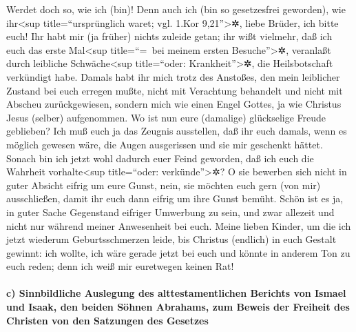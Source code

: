  Werdet doch so, wie ich (bin)! Denn auch ich (bin so
gesetzesfrei geworden), wie ihr\textless sup title=``ursprünglich waret;
vgl. 1.Kor 9,21''\textgreater✲, liebe Brüder, ich bitte euch! Ihr habt
mir (ja früher) nichts zuleide getan;  ihr wißt vielmehr,
daß ich euch das erste Mal\textless sup title=``=~bei meinem ersten
Besuche''\textgreater✲, veranlaßt durch leibliche Schwäche\textless sup
title=``oder: Krankheit''\textgreater✲, die Heilsbotschaft verkündigt
habe.  Damals habt ihr mich trotz des Anstoßes, den mein
leiblicher Zustand bei euch erregen mußte, nicht mit Verachtung
behandelt und nicht mit Abscheu zurückgewiesen, sondern mich wie einen
Engel Gottes, ja wie Christus Jesus (selber) aufgenommen.
 Wo ist nun eure (damalige) glückselige Freude geblieben?
Ich muß euch ja das Zeugnis ausstellen, daß ihr euch damals, wenn es
möglich gewesen wäre, die Augen ausgerissen und sie mir geschenkt
hättet.  Sonach bin ich jetzt wohl dadurch euer Feind
geworden, daß ich euch die Wahrheit vorhalte\textless sup title=``oder:
verkünde''\textgreater✲?  O sie bewerben sich nicht in
guter Absicht eifrig um eure Gunst, nein, sie möchten euch gern (von
mir) ausschließen, damit ihr euch dann eifrig um ihre Gunst bemüht.
 Schön ist es ja, in guter Sache Gegenstand eifriger
Umwerbung zu sein, und zwar allezeit und nicht nur während meiner
Anwesenheit bei euch.  Meine lieben Kinder, um die ich
jetzt wiederum Geburtsschmerzen leide, bis Christus (endlich) in euch
Gestalt gewinnt:  ich wollte, ich wäre gerade jetzt bei
euch und könnte in anderem Ton zu euch reden; denn ich weiß mir
euretwegen keinen Rat!

\hypertarget{c-sinnbildliche-auslegung-des-alttestamentlichen-berichts-von-ismael-und-isaak-den-beiden-suxf6hnen-abrahams-zum-beweis-der-freiheit-des-christen-von-den-satzungen-des-gesetzes}{%
\paragraph{c) Sinnbildliche Auslegung des alttestamentlichen Berichts
von Ismael und Isaak, den beiden Söhnen Abrahams, zum Beweis der
Freiheit des Christen von den Satzungen des
Gesetzes}\label{c-sinnbildliche-auslegung-des-alttestamentlichen-berichts-von-ismael-und-isaak-den-beiden-suxf6hnen-abrahams-zum-beweis-der-freiheit-des-christen-von-den-satzungen-des-gesetzes}}

